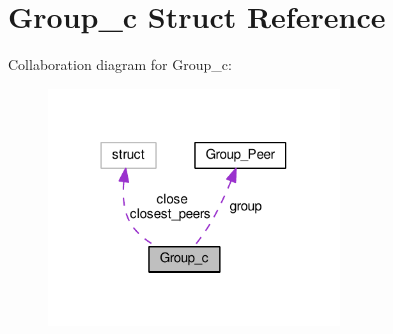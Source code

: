 \hypertarget{struct_group__c}{\section{Group\+\_\+c Struct Reference}
\label{struct_group__c}
}


Collaboration diagram for Group\+\_\+c\+:
\nopagebreak
\begin{figure}[H]
\begin{center}
\leavevmode
\includegraphics[width=219pt]{struct_group__c__coll__graph}
\end{center}
\end{figure}
